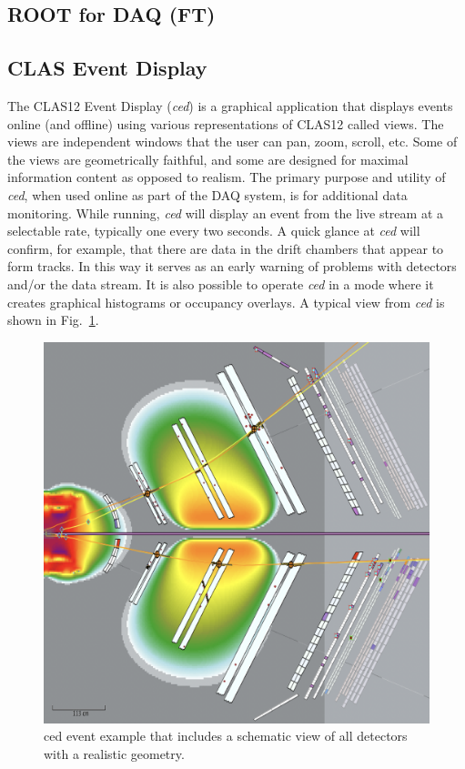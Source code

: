 \subsection{ROOT for DAQ (FT)}



\subsection{CLAS Event Display}

The CLAS12 Event Display ({\it ced}) is a graphical application that displays events online (and offline) using
various representations of CLAS12 called views. The views are independent windows that the user can pan, zoom, scroll,
etc. Some of the views are geometrically faithful, and some are designed for maximal information content as opposed to
realism. The primary purpose and utility of {\it ced}, when used online as part of the DAQ system, is for additional data
monitoring. While running, {\it ced} will display an event from the live stream at a selectable rate, typically one every two
seconds. A quick glance at {\it ced} will confirm, for example, that there are data in the drift chambers that appear to form
tracks. In this way it serves as an early warning of problems with detectors and/or the data stream. It is also possible to
operate {\it ced} in a mode where it creates graphical histograms or occupancy overlays. A typical view from {\it ced} is
shown in Fig.~\ref{fig:ced}.

\begin{figure}[hbt]
	\centering
	\includegraphics[width=1.0\columnwidth,keepaspectratio]{img/ced.png}
	\caption{ced event example that includes a schematic view of all detectors with a realistic geometry.}
	\label{fig:ced}
\end{figure}
